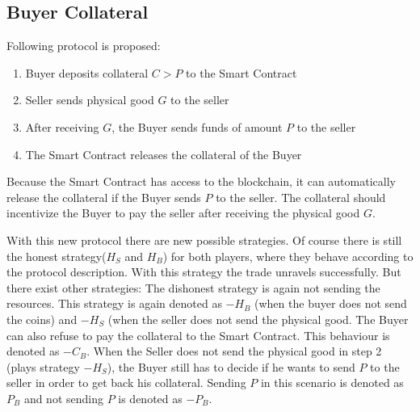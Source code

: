 \documentclass{cacthesis}
\begin{document}
\subsection{Buyer Collateral}
Following protocol is proposed:
\begin{enumerate}
    \item Buyer deposits collateral $C > P$ to the Smart Contract
    \item Seller sends physical good $G$ to the seller 
    \item After receiving $G$, the Buyer sends funds of amount $P$ to the seller 
    \item The Smart Contract releases the collateral of the Buyer
\end{enumerate}

Because the Smart Contract has access to the blockchain, it can automatically release the collateral if the Buyer sends $P$  to the seller. The collateral should incentivize the Buyer to pay the seller after receiving the physical good $G$.

With this new protocol there are new possible strategies. Of course there is still the honest strategy($H_S$ and $H_B$) for both players, where they behave according to the protocol description. With this strategy the trade unravels successfully.\newline
But there exist other strategies: The dishonest strategy is again not sending the resources. This strategy is again denoted as $-H_B$ (when the buyer does not send the coins) and $-H_S$ (when the seller does not send the physical good.\newline
The Buyer can also refuse to pay the collateral to the Smart Contract. This behaviour is denoted as $-C_B$.\newline
When the Seller does not send the physical good in step 2 (plays strategy $-H_S$), the Buyer still has to decide if he wants to send $P$ to the seller in order to get back his collateral. Sending $P$ in this scenario is denoted as $P_B$ and not sending $P$ is denoted as $-P_B$.\newline

\end{document}
